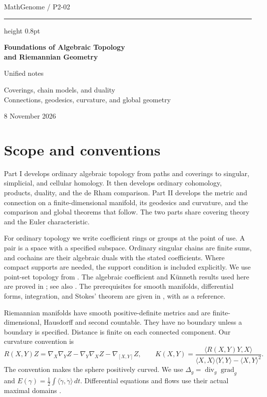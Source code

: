 \documentclass[11pt,oneside,openany]{book}
\theoremstyle{plain}
\theoremstyle{definition}
\theoremstyle{remark}
\begin{document}
\frontmatter
\hypersetup{pageanchor=false}
\begin{titlepage}
\thispagestyle{empty}
\vspace*{27mm}
{\large MathGenome \enspace / \enspace P2-02\par}
\vspace{8mm}
\hrule height 0.8pt
\vspace{11mm}
{\Huge\bfseries Foundations of Algebraic Topology\\[2mm]
and Riemannian Geometry\par}
\vspace{12mm}
{\large Unified notes\par}
\vspace{6mm}
{\normalsize Coverings, chain models, and duality\\
Connections, geodesics, curvature, and global geometry\par}
\vfill
{\large 8 November 2026\par}
\end{titlepage}
\hypersetup{pageanchor=true}
\tableofcontents
\chapter*{Scope and conventions}

Part I develops ordinary algebraic topology from paths and coverings to
singular, simplicial, and cellular homology. It then develops ordinary
cohomology, products, duality, and the de Rham comparison. Part II develops
the metric and connection on a finite-dimensional manifold, its geodesics
and curvature, and the comparison and global theorems that follow.
The two parts share covering theory and the Euler characteristic.

For ordinary topology we write coefficient rings or groups at the
point of use. A pair is a space with a specified subspace. Ordinary
singular chains are finite sums, and cochains are their algebraic
duals with the stated coefficients. Where compact supports are needed,
the support condition is included explicitly. We use point-set
topology from \cite{D10}. The algebraic coefficient and K\"unneth
results used here are proved in \cite[Chapter 11]{P103}; see also
\cite{Weibel}. The prerequisites for smooth manifolds, differential
forms, integration, and Stokes' theorem are given in \cite{P104},
with \cite{LeeSM} as a reference.

Riemannian manifolds have smooth positive-definite metrics and are
finite-dimensional, Hausdorff and second countable. They have no
boundary unless a boundary is specified. Distance is finite on each
connected component. Our curvature convention is
\[
 R(X,Y)Z=\nabla_X\nabla_Y Z-\nabla_Y\nabla_X Z-\nabla_{[X,Y]}Z,
 \qquad
 K(X,Y)=\frac{\langle R(X,Y)Y,X\rangle}
 {\langle X,X\rangle\langle Y,Y\rangle-\langle X,Y\rangle^2}.
\]
The convention makes the sphere positively curved. We use
\(\Delta_g=\operatorname{div}_g\operatorname{grad}_g\) and
\(E(\gamma)=\tfrac12\int\langle\dot\gamma,\dot\gamma\rangle\,dt\).
Differential equations and flows use their actual maximal domains
\cite{D13,P104}.
\end{document}
